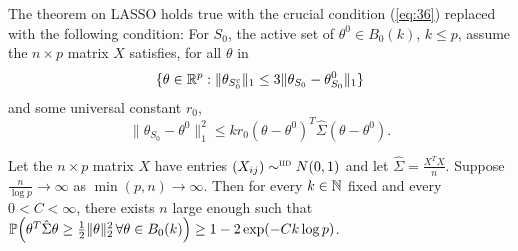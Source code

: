 \begin{thm}
  The theorem on LASSO holds true with the crucial condition
  (\ref{eq:36}) replaced with the following condition: For $S_{0}$,
  the active set of $\theta^{0} \in B_{0}(k)$, $k \leq p$, assume the
  $n \times p$ matrix $X$ satisfies, for all $\theta$ in
  \begin{equation}
    \label{eq:37}
    \{ \theta \in \mathbb{R}^{p} : \| \theta_{S_{0}^{c}} \|_{1} \leq 3 \|
    \theta_{S_{0}} - \theta_{S_{0}}^{0} \|_{1} \}
  \end{equation} and some universal constant $r_{0}$,
  \begin{equation}
    \label{eq:38}
    \| \theta_{S_{0}} - \theta^{0} \|_{1}^{2} \leq k r_{0} (\theta -
    \theta^{0})^{T} \hat \Sigma (\theta - \theta^{0}).
  \end{equation}
\end{thm}

\begin{thm}
  Let the $n \times p$ matrix $X$ have entries $(X_{ij}) \sim^{\textsc{iid}}
  N(0, 1)$  and let $\hat \Sigma = \frac{X^{T} X}{n}$.  Suppose
  $\frac{n}{\log p}  \rightarrow \infty$ as $\min(p, n) \rightarrow
  \infty$.  Then for every $k \in \mathbb{N}$ fixed and every $0 < C <
  \infty$, there exists $n$ large enough such that $\Prob{\theta^{T}
    \hat \Sigma \theta \geq \frac{1}{2} \| \theta \|_{2}^{2}\, \forall
  \theta \in B_{0}(k)} \geq 1 - 2 \exp(-Ck \log p)$.
\end{thm}

